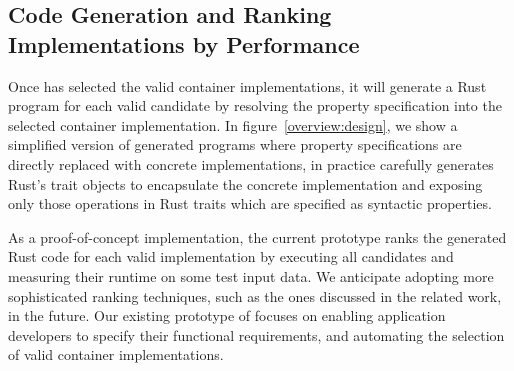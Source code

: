 \subsection{Code Generation and Ranking Implementations by Performance}
\label{chap2:rank}
Once \Primrose{} has selected the valid container implementations, it will generate a Rust program for each valid candidate by resolving the property specification into the selected container implementation.
In figure~\ref{overview:design}, we show a simplified version of generated programs where property specifications are directly replaced with concrete implementations, in practice \Primrose{} carefully generates Rust's trait objects to encapsulate the concrete implementation and exposing only those operations in Rust traits which are specified as syntactic properties.

As a proof-of-concept implementation, the current \Primrose{} prototype ranks the generated Rust code for each valid implementation by executing all candidates and measuring their runtime on some test input data.
We anticipate adopting more sophisticated ranking techniques, such as the ones discussed in the related work, in the future.
Our existing prototype of \Primrose{} focuses on enabling application developers to specify their functional requirements, and automating the selection of valid container implementations.

